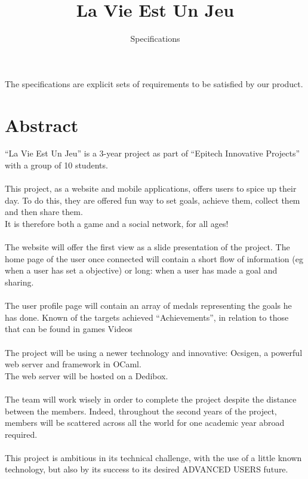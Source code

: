 \documentclass {life-en}
\begin{document}
\title{La Vie Est Un Jeu}
\subtitle{Specifications}

\summary
{
        The specifications are explicit sets of requirements to be satisfied
        by our product.
}

\maketitle
\authorspageen


\chapter*{Abstract}
{
  ``La Vie Est Un Jeu'' is a 3-year project as part of ``Epitech
  Innovative Projects'' with a group of 10 students.\\
  \\
  This project, as a website and mobile applications, offers
  users to spice up their day. To do this, they are offered
  fun way to set goals, achieve them, collect them
  and then share them.\\
  It is therefore both a game and a social network, for all ages!\\
  \\
  The website will offer the first view as a slide presentation of
  the project. The home page of the user once connected will contain a
  short flow of information (eg when a user has set a
  objective) or long: when a user has made a goal and sharing.
  \\\\
  The user profile page will contain an array of medals representing
  the goals he has done. Known of the targets achieved
  ``Achievements'', in relation to those that can be found in games
  Videos\\
  \\
  The project will be using a newer technology and innovative:
  Ocsigen, a powerful web server and framework in OCaml.\\
  The web server will be hosted on a Dedibox.\\
  \\
  The team will work wisely in order to complete the project
  despite the distance between the members. Indeed, throughout the second
  years of the project, members will be scattered across all
  the world for one academic year abroad required.\\
  \\
  This project is ambitious in its technical challenge, with the use of a
  little known technology, but also by its success to its desired
  ADVANCED USERS future.
}
\end{document}
